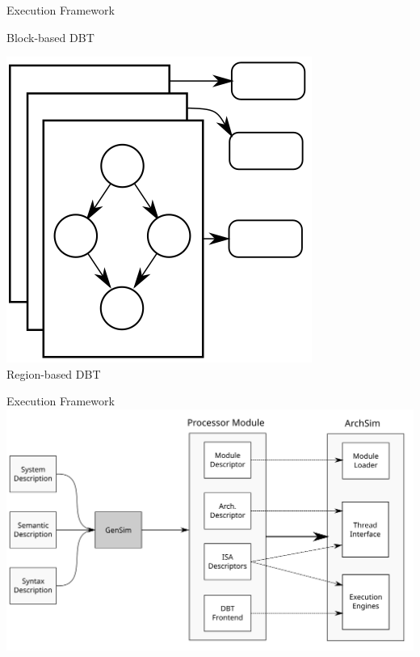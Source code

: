 \begin{frame}{Execution Framework}
\begin{minipage}{0.27\textwidth}
\smallskip
\centering
\footnotesize{Block-based DBT}
\end{minipage}
\qquad
\begin{minipage}{0.27\textwidth}
\includegraphics[width=\textwidth]{figures/mode-regionjit}\\
\smallskip
\centering
\footnotesize{Region-based DBT}
\end{minipage}

\end{frame}

\begin{frame}{Execution Framework}
\centering
\includegraphics[width=\textwidth]{figures/archsim-interface}
\end{frame}

